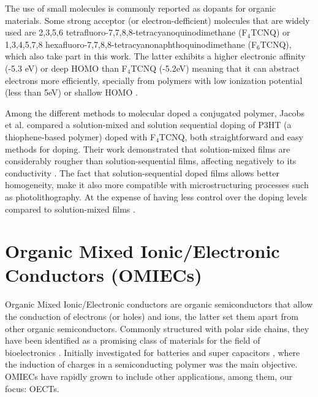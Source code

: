 The use of small molecules is commonly reported as dopants for organic materials. Some strong acceptor (or electron-defficient) molecules that are widely used are 2,3,5,6 tetrafluoro-7,7,8,8-tetracyanoquinodimethane (F$_{4}$TCNQ) or 1,3,4,5,7,8 hexafluoro-7,7,8,8-tetracyanonaphthoquinodimethane (F$_{6}$TCNQ), which also take part in this work. The latter exhibits a higher electronic affinity (-5.3 eV) or deep HOMO than F$_{4}$TCNQ (-5.2eV) meaning that it can abstract electrons more efficiently, specially from polymers with low ionization potential (less than 5eV) or shallow HOMO \cite{kieferDoubleDopingConjugated2019}%
.

Among the different methods to molecular doped a conjugated polymer, Jacobs et al. compared a solution-mixed and solution sequential doping of P3HT (a thiophene-based polymer) doped with F$_{4}$TCNQ, both straightforward and easy methods for doping. Their work demonstrated that solution-mixed films are considerably rougher than solution-sequential films, affecting negatively to its conductivity \cite{jacobsComparisonSolutionmixedSequentially2016}. The fact that solution-sequential doped films allows better homogeneity, make it also more compatible with microstructuring processes such as photolithography. At the expense of having less control over the doping levels compared to solution-mixed films \cite{tanOrganicMixedIonic2022}.

\section{Organic Mixed Ionic/Electronic Conductors (OMIECs)} \label{sec:omiecs}

Organic Mixed Ionic/Electronic conductors are organic semiconductors that allow the conduction of electrons (or holes) and ions, the latter set them apart from other organic semiconductors. %
Commonly structured with polar side chains, they have been identified as a promising class of materials for the field of bioelectronics
\cite{giovannittiEnergeticControlRedoxActive2020}. Initially investigated for batteries and super capacitors \cite{snookConductingpolymerbasedSupercapacitorDevices2011}
\cite{liangOrganicElectrodeMaterials2012}, where the induction of charges in a semiconducting polymer was the main objective. OMIECs have rapidly grown to include other applications, among them, our focus: OECTs.

